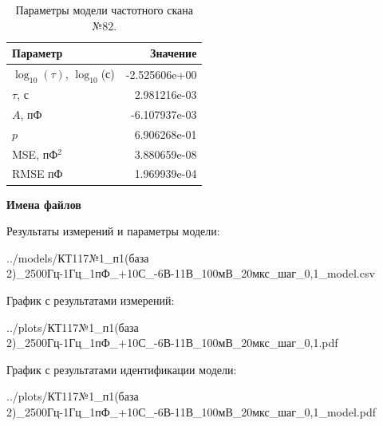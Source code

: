 \begin{table}[!ht]
    \centering
    \caption{Параметры модели частотного скана №82.}
    \begin{tabular}{|l|r|}
        \hline
        Параметр                                       & Значение                  \\ \hline
        $\log_{10}(\tau)$, $\log_{10}$(с)              & -2.525606e+00             \\ \hline
        $\tau$, с                                      & 2.981216e-03              \\ \hline
        $A$, пФ                                        & -6.107937e-03             \\ \hline
        $p$                                            & 6.906268e-01              \\ \hline
        MSE, пФ$^2$                                    & 3.880659e-08              \\ \hline
        RMSE пФ                                        & 1.969939e-04              \\ \hline
    \end{tabular}
    \label{table:frequency_scan_model_82}
\end{table}

\textbf{Имена файлов}

Результаты измерений и параметры модели:

\scriptsize../models/КТ117№1\_п1(база 2)\_2500Гц-1Гц\_1пФ\_+10С\_-6В-11В\_100мВ\_20мкс\_шаг\_0,1\_model.csv
\normalsize

График с результатами измерений:

\scriptsize../plots/КТ117№1\_п1(база 2)\_2500Гц-1Гц\_1пФ\_+10С\_-6В-11В\_100мВ\_20мкс\_шаг\_0,1.pdf
\normalsize

График с результатами идентификации модели:

\scriptsize../plots/КТ117№1\_п1(база 2)\_2500Гц-1Гц\_1пФ\_+10С\_-6В-11В\_100мВ\_20мкс\_шаг\_0,1\_model.pdf
\normalsize

